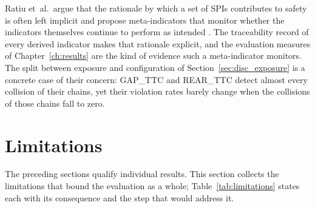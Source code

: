 Ratiu et~al.\ argue that the rationale by which a set of \acp{SPI} contributes to
safety is often left implicit and propose meta-indicators that monitor whether the
indicators themselves continue to perform as intended \cite{ratiu2024}. The
traceability record of every derived indicator makes that rationale explicit, and
the evaluation measures of Chapter~\ref{ch:results} are the kind of evidence such a
meta-indicator monitors. The split between exposure and configuration of
Section~\ref{sec:disc_exposure} is a concrete case of their concern: GAP\_TTC and
REAR\_TTC detect almost every collision of their chains, yet their violation rates
barely change when the collisions of those chains fall to zero.

\section{Limitations}
\label{sec:disc_limitations}

The preceding sections qualify individual results. This section collects the
limitations that bound the evaluation as a whole;
Table~\ref{tab:limitations} states each with its consequence and the step that
would address it.

